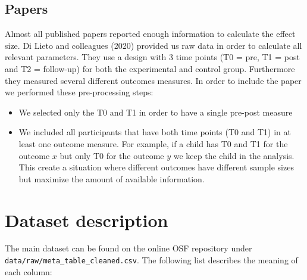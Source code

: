 \documentclass[
]{article}
\newenvironment{Shaded}{\begin{snugshade}}{\end{snugshade}}
\newcommand{\FunctionTok}[1]{\textcolor[rgb]{0.00,0.00,0.00}{#1}}
\newcommand{\NormalTok}[1]{#1}
\newcommand{\SpecialCharTok}[1]{\textcolor[rgb]{0.00,0.00,0.00}{#1}}
\providecommand{\tightlist}{%
  \setlength{\itemsep}{0pt}\setlength{\parskip}{0pt}}
\begin{document}
\hypertarget{papers}{%
\subsection{Papers}\label{papers}}

Almost all published papers reported enough information to calculate the effect size. Di Lieto and colleagues (2020) provided us raw data in order to calculate all relevant parameters. They use a design with 3 time points (T0 = pre, T1 = post and T2 = follow-up) for both the experimental and control group. Furthermore they measured several different outcomes measures. In order to include the paper we performed these pre-processing steps:

\begin{itemize}
\tightlist
\item
  We selected only the T0 and T1 in order to have a single pre-post measure
\item
  We included all participants that have both time points (T0 and T1) in at least one outcome measure. For example, if a child has T0 and T1 for the outcome \(x\) but only T0 for the outcome \(y\) we keep the child in the analysis. This create a situation where different outcomes have different sample sizes but maximize the amount of available information.
\end{itemize}

\hypertarget{dataset}{%
\section{Dataset description}\label{dataset}}

The main dataset can be found on the online OSF repository under \texttt{data/raw/meta\_table\_cleaned.csv}. The following list describes the meaning of each column:

\begin{Shaded}
\end{Shaded}
\end{document}
